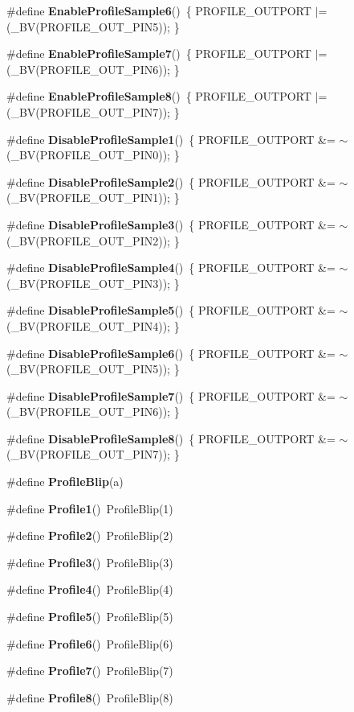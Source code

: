 \begin{CompactItemize}
\item 
\#define {\bf Enable\-Profile\-Sample6}()~\{ PROFILE\_\-OUTPORT $|$= (\_\-BV(PROFILE\_\-OUT\_\-PIN5)); \}
\item 
\#define {\bf Enable\-Profile\-Sample7}()~\{ PROFILE\_\-OUTPORT $|$= (\_\-BV(PROFILE\_\-OUT\_\-PIN6)); \}
\item 
\#define {\bf Enable\-Profile\-Sample8}()~\{ PROFILE\_\-OUTPORT $|$= (\_\-BV(PROFILE\_\-OUT\_\-PIN7)); \}
\item 
\#define {\bf Disable\-Profile\-Sample1}()~\{ PROFILE\_\-OUTPORT \&= $\sim$(\_\-BV(PROFILE\_\-OUT\_\-PIN0)); \}
\item 
\#define {\bf Disable\-Profile\-Sample2}()~\{ PROFILE\_\-OUTPORT \&= $\sim$(\_\-BV(PROFILE\_\-OUT\_\-PIN1)); \}
\item 
\#define {\bf Disable\-Profile\-Sample3}()~\{ PROFILE\_\-OUTPORT \&= $\sim$(\_\-BV(PROFILE\_\-OUT\_\-PIN2)); \}
\item 
\#define {\bf Disable\-Profile\-Sample4}()~\{ PROFILE\_\-OUTPORT \&= $\sim$(\_\-BV(PROFILE\_\-OUT\_\-PIN3)); \}
\item 
\#define {\bf Disable\-Profile\-Sample5}()~\{ PROFILE\_\-OUTPORT \&= $\sim$(\_\-BV(PROFILE\_\-OUT\_\-PIN4)); \}
\item 
\#define {\bf Disable\-Profile\-Sample6}()~\{ PROFILE\_\-OUTPORT \&= $\sim$(\_\-BV(PROFILE\_\-OUT\_\-PIN5)); \}
\item 
\#define {\bf Disable\-Profile\-Sample7}()~\{ PROFILE\_\-OUTPORT \&= $\sim$(\_\-BV(PROFILE\_\-OUT\_\-PIN6)); \}
\item 
\#define {\bf Disable\-Profile\-Sample8}()~\{ PROFILE\_\-OUTPORT \&= $\sim$(\_\-BV(PROFILE\_\-OUT\_\-PIN7)); \}
\item 
\#define {\bf Profile\-Blip}(a)
\item 
\#define {\bf Profile1}()~Profile\-Blip(1)
\item 
\#define {\bf Profile2}()~Profile\-Blip(2)
\item 
\#define {\bf Profile3}()~Profile\-Blip(3)
\item 
\#define {\bf Profile4}()~Profile\-Blip(4)
\item 
\#define {\bf Profile5}()~Profile\-Blip(5)
\item 
\#define {\bf Profile6}()~Profile\-Blip(6)
\item 
\#define {\bf Profile7}()~Profile\-Blip(7)
\item 
\#define {\bf Profile8}()~Profile\-Blip(8)
\end{CompactItemize}


